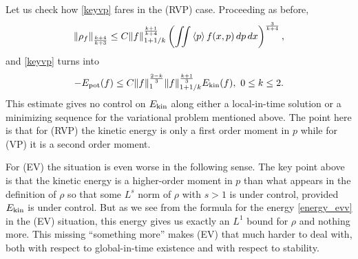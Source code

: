 \documentclass[11pt]{article}
\begin{document}
Let us check how \eqref{keyvp} fares in the (RVP) case.
Proceeding as before,
\[
\|\rho_f\|_{\frac{k+4}{k+3}} \leq C  \|f\|_{1+1/k}^{\frac{k+1}{k+4}}
\left(\iint \left\langle p\right\rangle f(x,p)\, dp\, dx\right)^{\frac{3}{k+4}},
\]
and \eqref{keyvp} turns into
\begin{equation} \label{keyrvp}
  -E_\mathrm{pot}(f) \leq C \|f\|_1^{\frac{2-k}{3}}\|f\|_{1+1/k}^{\frac{k+1}{3}} E_\mathrm{kin}(f),\
  0\leq k\leq 2.
\end{equation}
This estimate gives no control
on $E_\mathrm{kin}$ along either a local-in-time solution or a minimizing sequence
for the variational problem mentioned above.
The point here is that for (RVP) the kinetic energy is
only a first order moment in $p$ while for (VP) it is a second order moment.

For (EV) the situation is even worse in the following sense.
The key point above is that the kinetic energy is a higher-order moment
in $p$ than what appears in the definition of $\rho$ so that
some  $L^s$ norm of $\rho$ with $s>1$ is under control, provided
$E_\mathrm{kin}$ is under control. But as we see from the formula for the energy
\eqref{energy_evv} in the (EV) situation, this energy gives us exactly an
$L^1$ bound for $\rho$ and nothing more.
This missing ``something more'' makes (EV) that much harder to deal with,
both with respect to global-in-time existence and with respect to stability.
%
%
\end{document}
